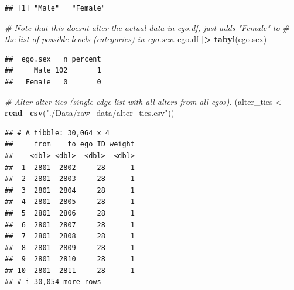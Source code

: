 \documentclass[
]{book}
\newenvironment{Shaded}{\begin{snugshade}}{\end{snugshade}}
\newcommand{\CommentTok}[1]{\textcolor[rgb]{0.56,0.35,0.01}{\textit{#1}}}
\newcommand{\FunctionTok}[1]{\textcolor[rgb]{0.13,0.29,0.53}{\textbf{#1}}}
\newcommand{\NormalTok}[1]{#1}
\newcommand{\OtherTok}[1]{\textcolor[rgb]{0.56,0.35,0.01}{#1}}
\newcommand{\SpecialCharTok}[1]{\textcolor[rgb]{0.81,0.36,0.00}{\textbf{#1}}}
\newcommand{\StringTok}[1]{\textcolor[rgb]{0.31,0.60,0.02}{#1}}
\begin{document}
\begin{verbatim}
## [1] "Male"   "Female"
\end{verbatim}

\begin{Shaded}
\begin{Highlighting}[]
\CommentTok{\# Note that this doesn\textquotesingle{}t alter the actual data in ego.df, just adds "Female" to }
\CommentTok{\# the list of possible levels (categories) in ego.sex.}
\NormalTok{ego.df }\SpecialCharTok{|\textgreater{}}
  \FunctionTok{tabyl}\NormalTok{(ego.sex)}
\end{Highlighting}
\end{Shaded}

\begin{verbatim}
##  ego.sex   n percent
##     Male 102       1
##   Female   0       0
\end{verbatim}

\begin{Shaded}
\begin{Highlighting}[]
\CommentTok{\# Alter{-}alter ties (single edge list with all alters from all egos).}
\NormalTok{(alter\_ties }\OtherTok{\textless{}{-}} \FunctionTok{read\_csv}\NormalTok{(}\StringTok{"./Data/raw\_data/alter\_ties.csv"}\NormalTok{))}
\end{Highlighting}
\end{Shaded}

\begin{verbatim}
## # A tibble: 30,064 x 4
##     from    to ego_ID weight
##    <dbl> <dbl>  <dbl>  <dbl>
##  1  2801  2802     28      1
##  2  2801  2803     28      1
##  3  2801  2804     28      1
##  4  2801  2805     28      1
##  5  2801  2806     28      1
##  6  2801  2807     28      1
##  7  2801  2808     28      1
##  8  2801  2809     28      1
##  9  2801  2810     28      1
## 10  2801  2811     28      1
## # i 30,054 more rows
\end{verbatim}
\end{document}
